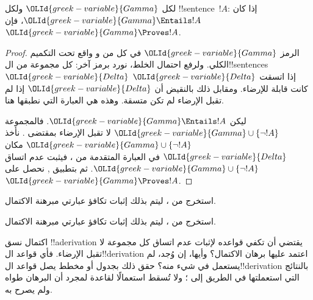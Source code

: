 \documentclass[../../../include/open-logic-section]{subfiles}
\begin{document}
\begin{cor}
لكل $\OLId{greek-variable}{Gamma}$ ولكل !!{sentence}~$!A$: إذا كان $\OLId{greek-variable}{Gamma} \Entails !A$،
فإن $\OLId{greek-variable}{Gamma} \Proves !A$.
\end{cor}

\begin{proof}
الرمز $\OLId{greek-variable}{Gamma}$ في كل من  و
 واقع تحت التكميم الكلي. ولرفع احتمال الخلط،
نورد  برمز آخر: كل مجموعة من
ال!!{sentence}s~$\OLId{greek-variable}{Delta}$ إذا اتسقت $\OLId{greek-variable}{Delta}$ كانت قابلة للإرضاء.
ومقابل ذلك بالنقيض أن $\OLId{greek-variable}{Delta}$ إذا لم تقبل الإرضاء لم تكن متسقة.
وهذه هي العبارة التي نطبقها هنا.

ليكن $\OLId{greek-variable}{Gamma} \Entails !A$. فالمجموعة $\OLId{greek-variable}{Gamma} \cup \{\lnot !A\}$
لا تقبل الإرضاء بمقتضى . نأخذ
$\OLId{greek-variable}{Gamma} \cup \{\lnot !A\}$ مكان $\OLId{greek-variable}{Delta}$ في العبارة المتقدمة من
، فيثبت عدم اتساق $\OLId{greek-variable}{Gamma} \cup \{\lnot !A\}$.
ثم بتطبيق
,
نحصل على $\OLId{greek-variable}{Gamma} \Proves !A$.
\end{proof}

\begin{prob}
استخرج من 
، ليتم بذلك إثبات تكافؤ
عبارتي مبرهنة الاكتمال.
\end{prob}
\tagendprob

\begin{prob}
استخرج من 
، ليتم بذلك إثبات تكافؤ
عبارتي مبرهنة الاكتمال.
\end{prob}
\tagendprob

\begin{prob}
اكتمال نسق !!a{derivation} يقتضي أن تكفي قواعده لإثبات عدم اتساق
كل مجموعة لا تقبل الإرضاء. فأي قواعد ال!!{derivation} اعتمد عليها
برهان الاكتمال؟ وأيها، إن وُجد، لم يستعمل في شيء منه؟ حقق ذلك بجدول
أو مخطط يصل قواعد ال!!{derivation} بالنتائج التي استعملتها في الطريق
إلى ؛ ولا تُسقط استعمالًا
لقاعدة لمجرد أن البرهان طواه ولم يصرح به.
\end{prob}
\tagendprob
\end{document}

